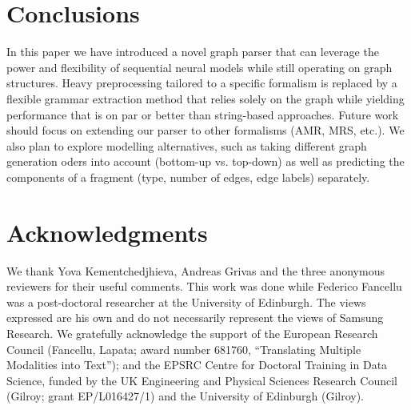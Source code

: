 \documentclass[11pt,a4paper]{article}
\theoremstyle{plain}
\begin{document}
\section{Conclusions}
In this paper we have introduced a novel graph parser that can
leverage the power and flexibility of sequential neural models while
still operating on graph structures. Heavy preprocessing tailored to a
specific formalism is replaced by a flexible grammar extraction method
that relies solely on the graph while yielding performance that is on
par or better than string-based approaches. Future work should focus
on extending our parser to other formalisms (AMR, MRS, etc.). We also
plan to explore modelling alternatives, such as taking different graph
generation oders into account (bottom-up vs. top-down) as well as
predicting the components of a fragment (type, number of edges, edge
labels) separately.

\section*{Acknowledgments}
We thank Yova Kementchedjhieva, Andreas Grivas and the three anonymous reviewers for their useful comments. This work was done while Federico Fancellu was a post-doctoral researcher at the University of Edinburgh. The views expressed are his own and do not necessarily represent the views of Samsung Research. We gratefully acknowledge the support of the European Research Council (Fancellu, Lapata; award number 681760, ``Translating Multiple Modalities into Text''); and the EPSRC Centre for Doctoral Training in Data Science, funded by the UK Engineering and Physical Sciences Research Council (Gilroy; grant EP/L016427/1) and the University of Edinburgh (Gilroy).



\end{document}
